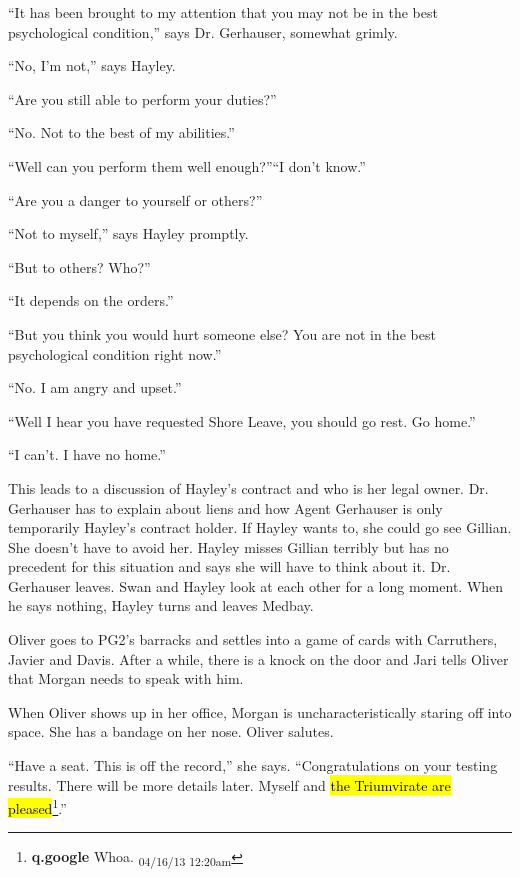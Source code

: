 ``It has been brought to my attention that you may not be in the best psychological condition,'' says Dr. Gerhauser, somewhat grimly.

``No, I'm not,'' says Hayley.

``Are you still able to perform your duties?''

``No.  Not to the best of my abilities.''

``Well can you perform them well enough?''``I don't know.''

``Are you a danger to yourself or others?''

``Not to myself,'' says Hayley promptly.

``But to others?  Who?''

``It depends on the orders.''

``But you think you would hurt someone else?  You are not in the best psychological condition right now.''

``No.  I am angry and upset.''

``Well I hear you have requested Shore Leave, you should go rest. Go home.''

``I can't.  I have no home.''

This leads to a discussion of Hayley's contract and who is her legal owner.  Dr. Gerhauser has to explain about liens and how Agent Gerhauser is only temporarily Hayley's contract holder.  If Hayley wants to, she could go see Gillian.  She doesn't have to avoid her.  Hayley misses Gillian terribly but has no precedent for this situation and says she will have to think about it.  Dr. Gerhauser leaves.  Swan and Hayley look at each other for a long moment.  When he says nothing, Hayley turns and leaves Medbay.



Oliver goes to PG2's barracks and settles into a game of cards with Carruthers, Javier and Davis.  After a while, there is a knock on the door and Jari tells Oliver that Morgan needs to speak with him.



When Oliver shows up in her office, Morgan is uncharacteristically staring off into space.  She has a bandage on her nose.  Oliver salutes. 



``Have a seat.  This is off the record,'' she says.  ``Congratulations on your testing results.  There will be more details later.  Myself and \hl{the Triumvirate are pleased}\footnote{\textbf{q.google }Whoa. \textsubscript{04/16/13 12:20am}}.''

